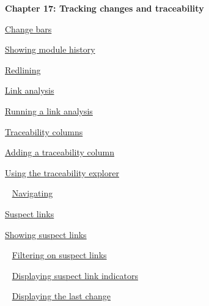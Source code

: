 \documentclass[11pt,a4paper]{article}
\begin{document}
\newpage

\begin{Large}\textbf{Chapter 17: Tracking changes and traceability} \end{Large} 
\vspace{1mm}

\href{https://www.ibm.com/support/knowledgecenter/search/Change%20bars?scope=SSYQBZ_9.6.1}{Change bars}

\href{https://www.ibm.com/support/knowledgecenter/search/Showing%20module%20history?scope=SSYQBZ_9.6.1}{Showing module history}

\href{https://www.ibm.com/support/knowledgecenter/search/Redlining?scope=SSYQBZ_9.6.1}{Redlining}

\href{https://www.ibm.com/support/knowledgecenter/search/Link%20analysis?scope=SSYQBZ_9.6.1}{Link analysis}

\href{https://www.ibm.com/support/knowledgecenter/search/Running%20a%20link%20analysis?scope=SSYQBZ_9.6.1}{Running a link analysis}

\href{https://www.ibm.com/support/knowledgecenter/search/Traceability%20columns?scope=SSYQBZ_9.6.1}{Traceability columns}

\href{https://www.ibm.com/support/knowledgecenter/search/Adding%20a%20traceability%20column?scope=SSYQBZ_9.6.1}{Adding a traceability column}

\href{https://www.ibm.com/support/knowledgecenter/search/Using%20the%20traceability%20explorer?scope=SSYQBZ_9.6.1}{Using the traceability explorer}

\,\,\, \href{https://www.ibm.com/support/knowledgecenter/search/Navigating?scope=SSYQBZ_9.6.1}{Navigating}

\href{https://www.ibm.com/support/knowledgecenter/search/Suspect%20links?scope=SSYQBZ_9.6.1}{Suspect links}

\href{https://www.ibm.com/support/knowledgecenter/search/Showing%20suspect%20links?scope=SSYQBZ_9.6.1}{Showing suspect links}

\,\,\, \href{https://www.ibm.com/support/knowledgecenter/search/Filtering%20on%20suspect%20links?scope=SSYQBZ_9.6.1}{Filtering on suspect links}

\,\,\, \href{https://www.ibm.com/support/knowledgecenter/search/Displaying%20suspect%20link%20indicators?scope=SSYQBZ_9.6.1}{Displaying suspect link indicators}

\,\,\, \href{https://www.ibm.com/support/knowledgecenter/search/Displaying%20the%20last%20change?scope=SSYQBZ_9.6.1}{Displaying the last change}
\end{document}
